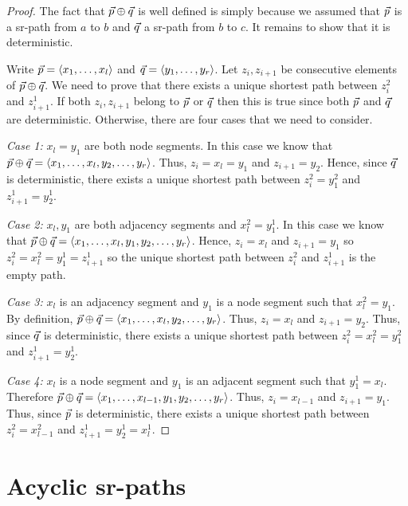\begin{proof}
The fact that $\vec{p} \oplus \vec{q}$ is well defined is simply because we assumed
that $\vec{p}$ is a sr-path from $a$ to $b$ and $\vec{q}$ a sr-path from $b$ to $c$. 
It remains to show that it is deterministic.

Write $\vec{p} = \langle x_1, \ldots, x_l \rangle$ and 
$\vec{q} = \langle y_1, \ldots, y_r \rangle$.
Let $z_i, z_{i + 1}$ be consecutive elements of $\vec{p} \oplus \vec{q}$. 
We need to prove that
there exists a unique shortest path between $z^2_i$ and $z^1_{i + 1}$.
If both $z_i, z_{i + 1}$ belong to $\vec{p}$ or $\vec{q}$ then this is true since both
$\vec{p}$ and $\vec{q}$ are deterministic. Otherwise, there are four cases that we need
to consider.

\emph{Case 1:} $x_l = y_1$ are both node segments. In this case we know that
$\vec{p} \oplus \vec{q} = \langle x_1, \ldots, x_l, y_2, \ldots, y_r \rangle$.
Thus, $z_i = x_l = y_1$ and $z_{i + 1} = y_2$. Hence, since $\vec{q}$ is deterministic,
there exists a unique shortest path between $z^2_i = y^2_1$ and $z^1_{i + 1} = y^1_2$.

\emph{Case 2:} $x_l,  y_1$ are both adjacency segments and 
$x^2_l = y^1_1$. In this case we know that
$\vec{p} \oplus \vec{q} = \langle x_1, \ldots, x_l, y_1, y_2, \ldots, y_r \rangle$.
Hence, $z_i = x_l$ and $z_{i + 1} = y_1$ so $z^2_i = x^2_l = y^1_1 = z^1_{i + 1}$ so
the unique shortest path between $z^2_i$ and $z^1_{i + 1}$ is the empty path.

\emph{Case 3:} $x_l$ is an adjacency segment and $y_1$ is a node segment such that
$x^2_l = y_1$. By definition, 
$\vec{p} \oplus \vec{q} = \langle x_1, \ldots, x_l, y_2, \ldots, y_r \rangle$.
Thus, $z_i = x_l$ and $z_{i + 1} = y_2$. Thus, since $\vec{q}$ is deterministic,
there exists a unique shortest path between $z^2_i = x^2_l = y^2_1$ and $z^1_{i + 1} = y^1_2$.

\emph{Case 4:} $x_l$ is a node segment and $y_1$ is an adjacent segment such that
$y^1_1 = x_l$. Therefore $\vec{p} \oplus \vec{q} = \langle x_1, \ldots, x_{l - 1}, y_1, y_2, \ldots, y_r \rangle$.
Thus, $z_i = x_{l - 1}$ and $z_{i + 1} = y_1$. Thus, since $\vec{p}$ is deterministic,
there exists a unique shortest path between $z^2_i = x^2_{l - 1}$ and $z^1_{i + 1} = y^1_2 = x^1_l$.
\end{proof}

\section{Acyclic sr-paths}
\label{section:acyclic}

